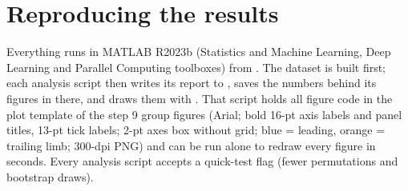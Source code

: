 \section{Reproducing the results}
\label{sec:repro}

Everything runs in MATLAB R2023b (Statistics and Machine Learning, Deep Learning and Parallel Computing toolboxes) from
. The dataset is built first; each analysis script then writes its report to ,
saves the numbers behind its figures in  there, and draws them with . That script holds all
figure code in the plot template of the step 9 group figures (Arial; bold 16-pt axis labels and panel titles, 13-pt tick labels;
2-pt axes box without grid; blue = leading, orange = trailing limb; 300-dpi PNG) and can be run alone to redraw every figure in
seconds. Every analysis script accepts a quick-test flag (fewer permutations and bootstrap draws).

